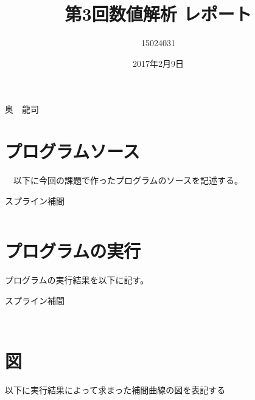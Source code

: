 \documentclass[a4j,titlepage]{jarticle}
\begin{document}

\title{第3回数値解析 レポート}

\author{15024031}{奥　龍司}

\date{2017年2月9日}
\maketitle



\section{プログラムソース}
　以下に今回の課題で作ったプログラムのソースを記述する。
 \begin{breakitembox}[l]{スプライン補間} \small
\begin{verbatim}

\end{verbatim}
\end{breakitembox}




\section{プログラムの実行}
プログラムの実行結果を以下に記す。
\begin{breakitembox}[l]{スプライン補間} \small
\begin{verbatim}


\end{verbatim}
\end{breakitembox}

\section{図}
以下に実行結果によって求まった補間曲線の図を表記する
\end{document}
